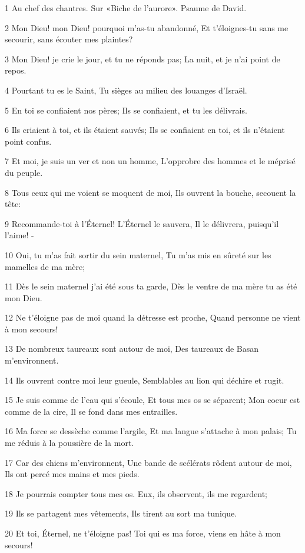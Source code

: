 \par 1 Au chef des chantres. Sur «Biche de l'aurore». Psaume de David.
\par 2 Mon Dieu! mon Dieu! pourquoi m'as-tu abandonné, Et t'éloignes-tu sans me secourir, sans écouter mes plaintes?
\par 3 Mon Dieu! je crie le jour, et tu ne réponds pas; La nuit, et je n'ai point de repos.
\par 4 Pourtant tu es le Saint, Tu sièges au milieu des louanges d'Israël.
\par 5 En toi se confiaient nos pères; Ils se confiaient, et tu les délivrais.
\par 6 Ils criaient à toi, et ils étaient sauvés; Ils se confiaient en toi, et ils n'étaient point confus.
\par 7 Et moi, je suis un ver et non un homme, L'opprobre des hommes et le méprisé du peuple.
\par 8 Tous ceux qui me voient se moquent de moi, Ils ouvrent la bouche, secouent la tête:
\par 9 Recommande-toi à l'Éternel! L'Éternel le sauvera, Il le délivrera, puisqu'il l'aime! -
\par 10 Oui, tu m'as fait sortir du sein maternel, Tu m'as mis en sûreté sur les mamelles de ma mère;
\par 11 Dès le sein maternel j'ai été sous ta garde, Dès le ventre de ma mère tu as été mon Dieu.
\par 12 Ne t'éloigne pas de moi quand la détresse est proche, Quand personne ne vient à mon secours!
\par 13 De nombreux taureaux sont autour de moi, Des taureaux de Basan m'environnent.
\par 14 Ils ouvrent contre moi leur gueule, Semblables au lion qui déchire et rugit.
\par 15 Je suis comme de l'eau qui s'écoule, Et tous mes os se séparent; Mon coeur est comme de la cire, Il se fond dans mes entrailles.
\par 16 Ma force se dessèche comme l'argile, Et ma langue s'attache à mon palais; Tu me réduis à la poussière de la mort.
\par 17 Car des chiens m'environnent, Une bande de scélérats rôdent autour de moi, Ils ont percé mes mains et mes pieds.
\par 18 Je pourrais compter tous mes os. Eux, ils observent, ils me regardent;
\par 19 Ils se partagent mes vêtements, Ils tirent au sort ma tunique.
\par 20 Et toi, Éternel, ne t'éloigne pas! Toi qui es ma force, viens en hâte à mon secours!
